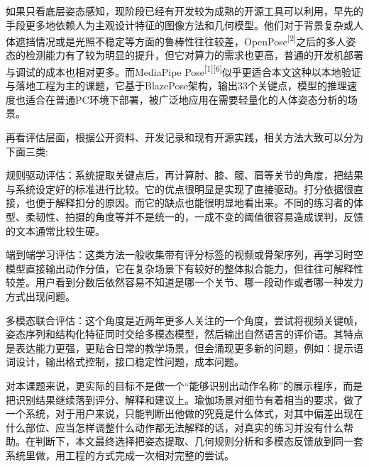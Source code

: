如果只看底层姿态感知，现阶段已经有开发较为成熟的开源工具可以利用，早先的手段更多地依赖人为主观设计特征的图像方法和几何模型。他们对于背景复杂或人体遮挡情况或是光照不稳定等方面的鲁棒性往往较差，OpenPose\textsuperscript{[2]}之后的多人姿态的检测能力有了较为明显的提升，但它对算力的需求也更高，普通的开发机部署与调试的成本也相对更多。而MediaPipe Pose\textsuperscript{[1][6]}似乎更适合本文这种以本地验证与落地工程为主的课题，它基于BlazePose架构，输出33个关键点，模型的推理速度也适合在普通PC环境下部署，被广泛地应用在需要轻量化的人体姿态分析的场景。

再看评估层面，根据公开资料、开发记录和现有开源实践，相关方法大致可以分为下面三类:
\begin{chineseenum}
  \item 规则驱动评估：系统提取关键点后，再计算肘、膝、髋、肩等关节的角度，把结果与系统设定好的标准进行比较。它的优点很明显是实现了直接驱动。打分依据很直接，也便于解释扣分的原因。而它的缺点也能很明显地看出来。不同的练习者的体型、柔韧性、拍摄的角度等并不是统一的，一成不变的阈值很容易造成误判，反馈的文本通常比较生硬。
  \item 端到端学习评估：这类方法一般收集带有评分标签的视频或骨架序列，再学习时空模型直接输出动作分值，它在复杂场景下有较好的整体拟合能力，但往往可解释性较差。用户看到分数后依然容易不知道是哪一个关节、哪一段动作或者哪一种发力方式出现问题。
  \item 多模态联合评估：这个角度是近两年更多人关注的一个角度，尝试将视频关键帧，姿态序列和结构化特征同时交给多模态模型，然后输出自然语言的评价语。其特点是表达能力更强，更贴合日常的教学场景，但会涌现更多新的问题，例如：提示语词设计，输出格式控制，接口稳定性问题，成本问题。
\end{chineseenum}

对本课题来说，更实际的目标不是做一个“能够识别出动作名称”的展示程序，而是把识别结果继续落到评分、解释和建议上。瑜伽场景对细节有着相当的要求，做了一个系统，对于用户来说，只能判断出他做的究竟是什么体式，对其中偏差出现在什么部位、应当怎样调整什么动作都无法解释的话，对真实的练习并没有什么帮助。在判断下，本文最终选择把姿态提取、几何规则分析和多模态反馈放到同一套系统里做，用工程的方式完成一次相对完整的尝试。

